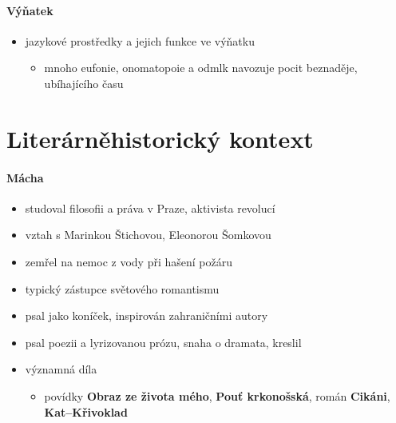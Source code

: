 \documentclass[10pt,a4paper]{article}
\begin{document}
\paragraph{Výňatek}
\begin{itemize}
\item jazykové prostředky a jejich funkce ve výňatku
	\begin{itemize}
	\item mnoho eufonie, onomatopoie a odmlk navozuje pocit beznaděje, ubíhajícího času
	\end{itemize}
\end{itemize}
\section*{Literárněhistorický kontext}
\paragraph{Mácha}
\begin{itemize}
\item studoval filosofii a práva v Praze, aktivista revolucí
\item vztah s Marinkou Štichovou, Eleonorou Šomkovou
\item zemřel na nemoc z vody při hašení požáru
\item typický zástupce světového romantismu
\item psal jako koníček, inspirován zahraničními autory
\item psal poezii a lyrizovanou prózu, snaha o dramata, kreslil\\
\item významná díla
	\begin{itemize}
	\item povídky \textbf{Obraz ze života mého}, \textbf{Pouť krkonošská}, román \textbf{Cikáni}, \textbf{Kat--Křivoklad}
	\end{itemize}
\end{itemize}
\end{document}
